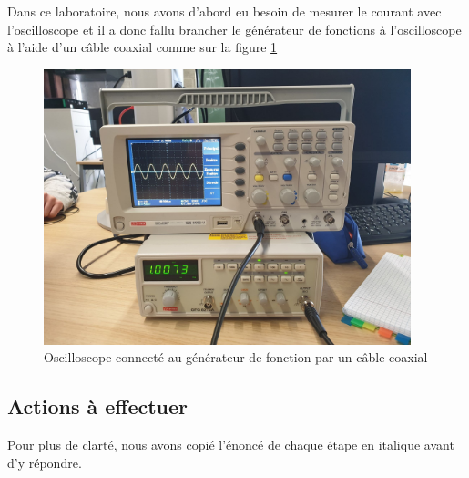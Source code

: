 \documentclass[a4paper]{article}
\begin{document}
Dans ce laboratoire, nous avons d'abord eu besoin de mesurer le courant avec l'oscilloscope et il a donc fallu brancher le générateur de fonctions à l'oscilloscope à l'aide d'un câble coaxial comme sur la figure \ref{fig:oscilloscopeGenerateur}

\begin{figure}%
    \centering
    \includegraphics[width=0.95\textwidth]{oscilloscope-generateur.jpg}
    \caption{Oscilloscope connecté au générateur de fonction par un câble coaxial}
    \label{fig:oscilloscopeGenerateur}
\end{figure}










\subsection{Actions à effectuer}





Pour plus de clarté, nous avons copié l'énoncé de chaque étape en italique avant d'y répondre.
\end{document}
